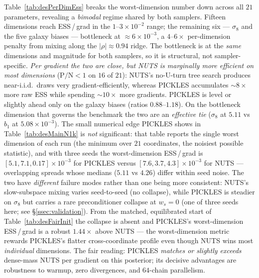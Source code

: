 \documentclass{article}
\begin{document}
Table~\ref{tab:desPerDimEss} breaks the worst-dimension number down
across all $21$ parameters, revealing a \emph{bimodal} regime shared by
both samplers. Fifteen dimensions reach ESS\,/\,grad in the
$1$--$3\times10^{-2}$ range; the remaining six --- $\sigma_8$ and the
five galaxy biases --- bottleneck at $\approx\!6\times10^{-3}$, a
$4$--$6\times$ per-dimension penalty from mixing along the
$|\rho|\!\approx\!0.94$ ridge. The bottleneck is at the \emph{same}
dimensions and magnitude for both samplers, so it is structural, not
sampler-specific. \emph{Per gradient the two are close, but NUTS is
marginally more efficient on most dimensions} ($\text{P}/\text{N}<1$ on
$16$ of $21$): NUTS's no-U-turn tree search produces near-i.i.d.\ draws
very gradient-efficiently, whereas PICKLES accumulates $\sim\!8\times$
more raw ESS while spending $\sim\!10\times$ more gradients. PICKLES is
level or slightly ahead only on the galaxy biases (ratios $0.88$--$1.18$).
On the bottleneck dimension that governs the benchmark the two are an
\emph{effective tie} ($\sigma_8$ at $5.11$ vs $b_1$ at
$5.08\times10^{-3}$). The small numerical edge PICKLES shows in
Table~\ref{tab:desMainN1k} is \emph{not} significant: that table reports
the single worst dimension of each run (the minimum over $21$
coordinates, the noisiest possible statistic), and with three seeds the
worst-dimension ESS\,/\,grad is $[5.1,7.1,0.17]\times10^{-3}$ for PICKLES
versus $[7.6,3.7,4.3]\times10^{-3}$ for NUTS --- overlapping spreads whose
medians ($5.11$ vs $4.26$) differ within seed noise. The two have
\emph{different} failure modes rather than one being more consistent:
NUTS's slow-subspace mixing varies seed-to-seed (no collapse), while
PICKLES is steadier on $\sigma_8$ but carries a rare preconditioner
collapse at $w_s{=}0$ (one of three seeds here; see
\S\ref{ssec:validation}). From the matched, equilibrated start of
Table~\ref{tab:desFairInit} the collapse is absent and PICKLES's
worst-dimension ESS\,/\,grad is a robust $1.44\times$ above NUTS --- the
worst-dimension metric rewards PICKLES's flatter cross-coordinate
profile even though NUTS wins most \emph{individual} dimensions. The fair
reading: PICKLES \emph{matches or slightly exceeds} dense-mass NUTS per
gradient on this posterior; its decisive advantages are robustness to
warmup, zero divergences, and $64$-chain parallelism.
\end{document}

